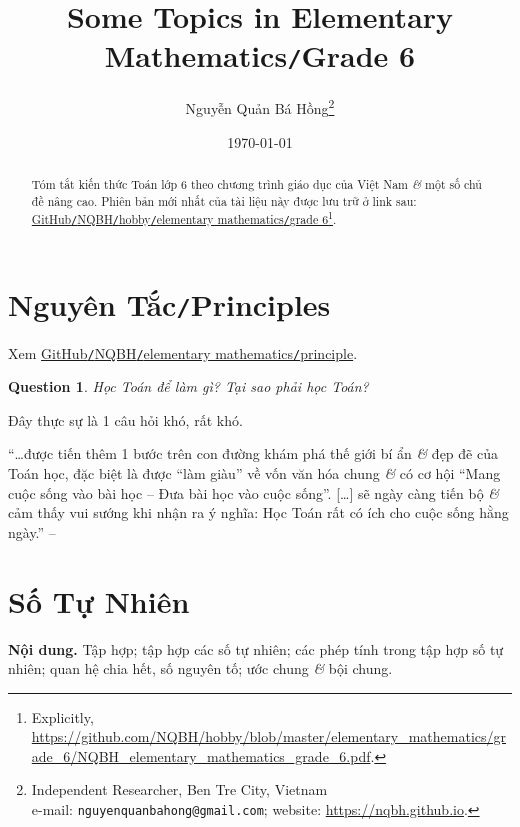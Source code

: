 \documentclass{article}
\title{Some Topics in Elementary Mathematics\texttt{/}Grade 6}
\author{Nguyễn Quản Bá Hồng\footnote{Independent Researcher, Ben Tre City, Vietnam\\e-mail: \texttt{nguyenquanbahong@gmail.com}; website: \url{https://nqbh.github.io}.}}
\date{\today}
\numberwithin{equation}{section}
\newtheorem{question}{Question}[section]
\begin{document}
\maketitle
\begin{abstract}
	Tóm tắt kiến thức Toán lớp 6 theo chương trình giáo dục của Việt Nam \textit{\&} một số chủ đề nâng cao. Phiên bản mới nhất của tài liệu này được lưu trữ ở link sau: \href{https://github.com/NQBH/hobby/blob/master/elementary_mathematics/grade_6/NQBH_elementary_mathematics_grade_6.pdf}{GitHub\texttt{/}NQBH\texttt{/}hobby\texttt{/}elementary mathematics\texttt{/}grade 6}\footnote{Explicitly, \url{https://github.com/NQBH/hobby/blob/master/elementary_mathematics/grade_6/NQBH_elementary_mathematics_grade_6.pdf}.}.
\end{abstract}
\setcounter{secnumdepth}{4}
\setcounter{tocdepth}{3}
\tableofcontents
\newpage


\section*{Nguyên Tắc\texttt{/}Principles}
Xem \href{https://github.com/NQBH/hobby/blob/master/elementary_mathematics/principle/NQBH_elementary_mathematics_principle.pdf}{GitHub\texttt{/}NQBH\texttt{/}elementary mathematics\texttt{/}principle}.

\begin{question}
	Học Toán để làm gì? Tại sao phải học Toán?
\end{question}
Đây thực sự là 1 câu hỏi khó, rất khó.

``\ldots được tiến thêm 1 bước trên con đường khám phá thế giới bí ẩn \textit{\&} đẹp đẽ của Toán học, đặc biệt là được ``làm giàu'' về vốn văn hóa chung \textit{\&} có cơ hội ``Mang cuộc sống vào bài học -- Đưa bài học vào cuộc sống''. [\ldots] sẽ ngày càng tiến bộ \textit{\&} cảm thấy vui sướng khi nhận ra ý nghĩa: Học Toán rất có ích cho cuộc sống hằng ngày.'' -- \cite[p. 1]{Thai_Anh_Dat_Ha_Loan_Nam_Quang_Toan_6_tap_1}


\section{Số Tự Nhiên}
\textbf{Nội dung.} Tập hợp; tập hợp các số tự nhiên; các phép tính trong tập hợp số tự nhiên; quan hệ chia hết, số nguyên tố; ước chung \textit{\&} bội chung.
\end{document}

